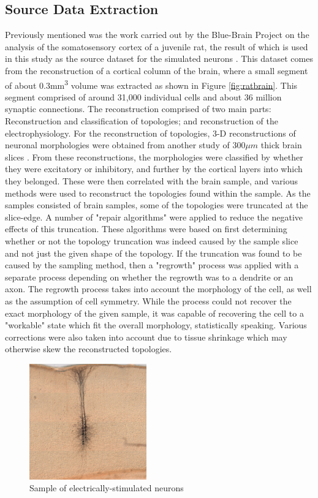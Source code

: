 \subsection{Source Data Extraction}
\label{chap:relwork:bbpData}
Previously mentioned was the work carried out by the Blue-Brain Project on the analysis of the somatosensory cortex of a juvenile rat, the result of which is used in this study as the source dataset for the simulated neurons \cite{reconSim}\cite{bbpTop}. This dataset comes from the reconstruction of a cortical column of the brain, where a small segment of about 0.3mm\textsuperscript{3} volume was extracted as shown in Figure \ref{fig:ratbrain}. This segment comprised of around 31,000 individual cells and about 36 million synaptic connections. The reconstruction comprised of two main parts: Reconstruction and classification of topologies; and reconstruction of the electrophysiology. For the reconstruction of topologies, 3-D reconstructions of neuronal morphologies were obtained from another study of $300\mu m$ thick brain slices \cite{markram1997physiology}. From these reconstructions, the morphologies were classified by whether they were excitatory or inhibitory, and further by the cortical layers into which they belonged. These were then correlated with the brain sample, and various methods were used to reconstruct the topologies found within the sample. As the samples consisted of brain samples, some of the topologies were truncated at the slice-edge. A number of "repair algorithms" were applied to reduce the negative effects of this truncation. These algorithms were based on first determining whether or not the topology truncation was indeed caused by the sample slice and not just the given shape of the topology. If the truncation was found to be caused by the sampling method, then a "regrowth" process was applied with a separate process depending on whether the regrowth was to a dendrite or an axon. The regrowth process takes into account the morphology of the cell, as well as the assumption of cell symmetry. While the process could not recover the exact morphology of the given sample, it was capable of recovering the cell to a "workable" state which fit the overall morphology, statistically speaking. Various corrections were also taken into account due to tissue shrinkage which may otherwise skew the reconstructed topologies.
\par
\begin{figure}
    \includegraphics[width=0.45\textwidth]{03-Related_Work/l2brain.jpg}
    \caption{Sample of electrically-stimulated neurons \cite{nmcPortal}}
    \label{fig:leccyStimNeuron}
\end{figure}
